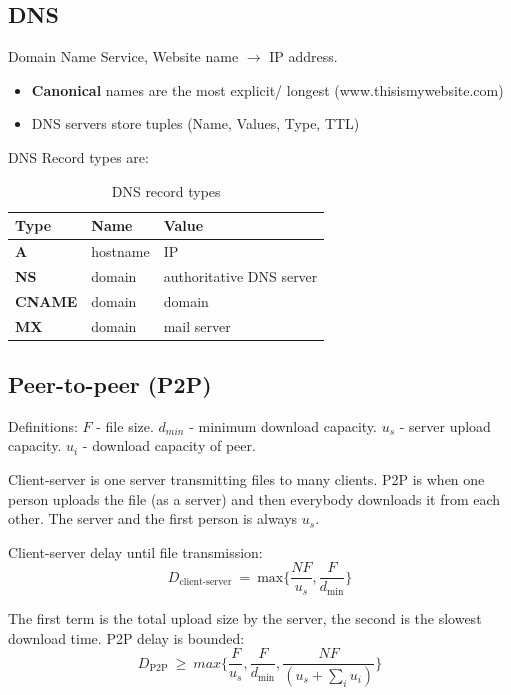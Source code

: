 \documentclass{article}
\begin{document}
\subsection{DNS}
Domain Name Service, Website name $\rightarrow$ IP address.

\begin{itemize}
    \item \textbf{Canonical} names are the most explicit/ longest (www.thisismywebsite.com)
    \item DNS servers store tuples (Name, Values, Type, TTL)
\end{itemize}

DNS Record types are:
\begin{table}[h]
    \centering
    \begin{tabular}{ lll }
        Type & Name & Value \\
        \hline
        \textbf{A} & hostname & IP \\
        \textbf{NS} & domain & authoritative DNS server \\
        \textbf{CNAME} & domain & domain \\
        \textbf{MX} & domain & mail server \\
    \end{tabular}
    \caption{DNS record types}
    \label{tab:dns}
\end{table}

\subsection{Peer-to-peer (P2P)}
Definitions: $F$ - file size. $d_{min}$ - minimum download capacity. $u_s$ - server upload capacity. $u_i$ - download capacity of peer.
\vskip 0.1in

Client-server is one server transmitting files to many clients. P2P is when one person uploads the file (as a server) and then everybody downloads it from each other. The server and the first person is always $u_s$.

Client-server delay until file transmission:
\begin{equation}
    D_{\text{client-server}}\ =\ \text{max}\lbrace \frac{NF}{u_s}, \frac{F}{d_{\text{min}}} \rbrace
\end{equation}

The first term is the total upload size by the server, the second is the slowest download time. P2P delay is bounded:
\begin{equation}
    D_{\text{P2P}}\ \geq\ max \lbrace \frac{F}{u_s}, \frac{F}{d_{\text{min}}}, \frac{NF}{(u_s + \sum_i u_i)} \rbrace
\end{equation}
\end{document}
